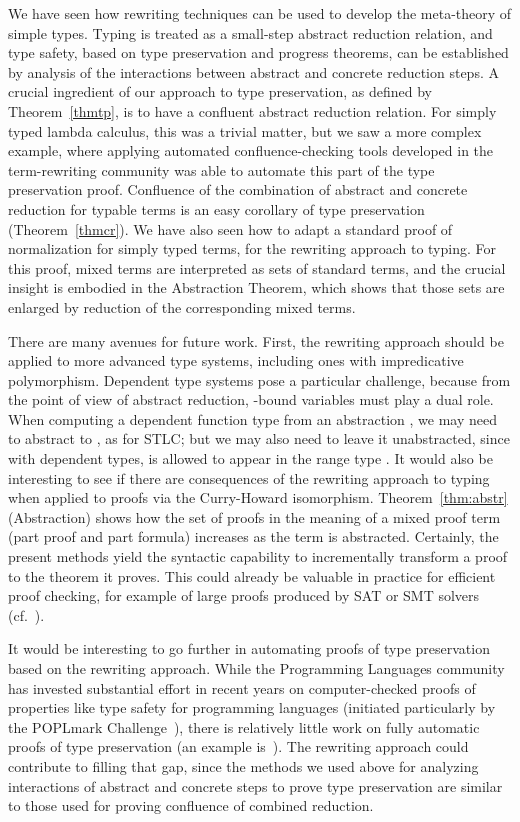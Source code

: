 \documentclass{LMCS}
\begin{document}
We have seen how rewriting techniques can be used to develop the
meta-theory of simple types.  Typing is treated as a small-step
abstract reduction relation, and type safety, based on type
preservation and progress theorems, can be established by analysis of
the interactions between abstract and concrete reduction steps.  A
crucial ingredient of our approach to type preservation, as defined by
Theorem~\ref{thmtp}, is to have a confluent abstract reduction
relation.  For simply typed lambda calculus, this was a trivial
matter, but we saw a more complex example, where applying automated
confluence-checking tools developed in the term-rewriting community
was able to automate this part of the type preservation proof.
Confluence of the combination of abstract and concrete reduction for
typable terms is an easy corollary of type preservation
(Theorem~\ref{thmcr}).  We have also seen how to adapt a standard
proof of normalization for simply typed terms, for the rewriting
approach to typing.  For this proof, mixed terms are interpreted as
sets of standard terms, and the crucial insight is embodied in the
Abstraction Theorem, which shows that those sets are enlarged by
reduction of the corresponding mixed terms.

There are many avenues for future work.  First, the rewriting approach
should be applied to more advanced type systems, including ones with
impredicative polymorphism.  Dependent type systems pose a particular
challenge, because from the point of view of abstract reduction,
-bound variables must play a dual role.  When computing a
dependent function type  from an abstraction , we may need to abstract  to , as for STLC; but we may
also need to leave it unabstracted, since with dependent types,  is
allowed to appear in the range type .  It would also be
interesting to see if there are consequences of the rewriting approach
to typing when applied to proofs via the Curry-Howard isomorphism.
Theorem~\ref{thm:abstr} (Abstraction) shows how the set of proofs in
the meaning of a mixed proof term (part proof and part formula)
increases as the term is abstracted.  Certainly, the present methods
yield the syntactic capability to incrementally transform a proof to
the theorem it proves.  This could already be valuable in practice for
efficient proof checking, for example of large proofs produced by SAT
or SMT solvers (cf.~\cite{stump+12}).

It would be interesting to go further in automating proofs of type
preservation based on the rewriting approach.  While the Programming
Languages community has invested substantial effort in recent years on
computer-checked proofs of properties like type safety for programming
languages (initiated particularly by the POPLmark
Challenge~\cite{poplmark}), there is relatively little work on fully
automatic proofs of type preservation (an example
is~\cite{schurmann+98}).  The rewriting approach could contribute to
filling that gap, since the methods we used above for analyzing
interactions of abstract and concrete steps to prove type preservation
are similar to those used for proving confluence of combined
reduction.
\end{document}
